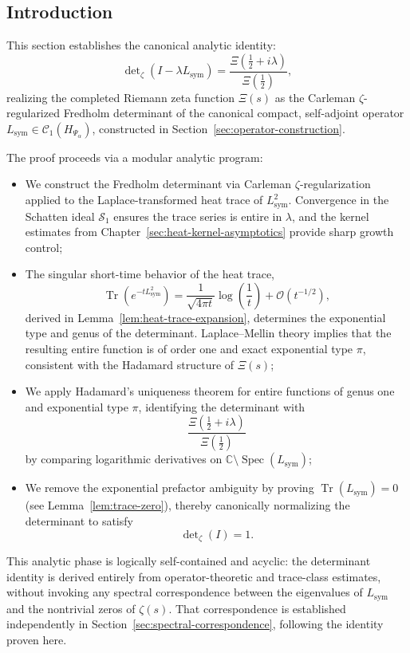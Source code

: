 \subsection*{Introduction}

This section establishes the canonical analytic identity:
\[
\det\nolimits_\zeta(I - \lambda L_{\mathrm{sym}})
= \frac{\Xi\left( \tfrac{1}{2} + i\lambda \right)}{\Xi\left( \tfrac{1}{2} \right)},
\]
realizing the completed Riemann zeta function \( \Xi(s) \) as the Carleman \(\zeta\)-regularized Fredholm determinant of the canonical compact, self-adjoint operator \( L_{\mathrm{sym}} \in \mathcal{C}_1(H_{\Psi_\alpha}) \), constructed in Section~\ref{sec:operator-construction}.

\medskip
\noindent
The proof proceeds via a modular analytic program:
\begin{itemize}
  \item We construct the Fredholm determinant via Carleman \(\zeta\)-regularization applied to the Laplace-transformed heat trace of \( L_{\mathrm{sym}}^2 \). Convergence in the Schatten ideal \( \mathcal{S}_1 \) ensures the trace series is entire in \( \lambda \), and the kernel estimates from Chapter~\ref{sec:heat-kernel-asymptotics} provide sharp growth control;

  \item The singular short-time behavior of the heat trace,
  \[
  \operatorname{Tr}(e^{-tL^2_{\mathrm{sym}}}) = \frac{1}{\sqrt{4\pi t}} \log\left(\frac{1}{t}\right) + \mathcal{O}(t^{-1/2}),
  \]
  derived in Lemma~\ref{lem:heat-trace-expansion}, determines the exponential type and genus of the determinant. Laplace–Mellin theory implies that the resulting entire function is of order one and exact exponential type \( \pi \), consistent with the Hadamard structure of \( \Xi(s) \);

  \item We apply Hadamard’s uniqueness theorem for entire functions of genus one and exponential type \( \pi \), identifying the determinant with
  \[
  \frac{\Xi\left( \tfrac{1}{2} + i\lambda \right)}{\Xi\left( \tfrac{1}{2} \right)}
  \]
  by comparing logarithmic derivatives on \( \mathbb{C} \setminus \operatorname{Spec}(L_{\mathrm{sym}}) \);

  \item We remove the exponential prefactor ambiguity by proving \( \operatorname{Tr}(L_{\mathrm{sym}}) = 0 \) (see Lemma~\ref{lem:trace-zero}), thereby canonically normalizing the determinant to satisfy
  \[
  \det\nolimits_\zeta(I) = 1.
  \]
\end{itemize}

\noindent
This analytic phase is logically self-contained and acyclic: the determinant identity is derived entirely from operator-theoretic and trace-class estimates, without invoking any spectral correspondence between the eigenvalues of \( L_{\mathrm{sym}} \) and the nontrivial zeros of \( \zeta(s) \). That correspondence is established independently in Section~\ref{sec:spectral-correspondence}, following the identity proven here.
% 